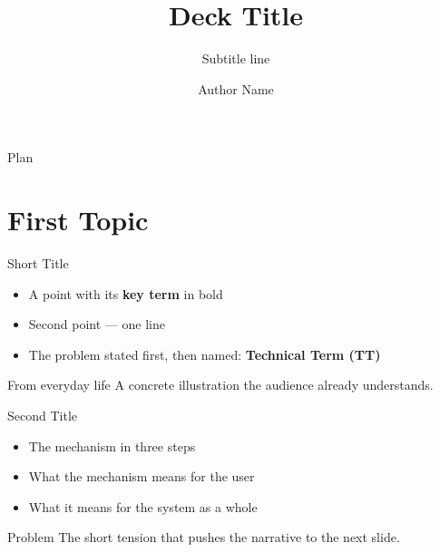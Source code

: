 

\title{Deck Title}
\subtitle{Subtitle line}
\author{Author Name}



\maketitleframe

\begin{frame}{Plan}
  \tableofcontents
\end{frame}

\section{First Topic}

\begin{frame}{Short Title}
  \begin{itemize}
    \item A point with its \textbf{key term} in bold
    \item Second point --- one line
    \item The problem stated first, then named: \textbf{Technical Term (TT)}
  \end{itemize}
  \vspace{0.3cm}
  \begin{exampleblock}{From everyday life}
    A concrete illustration the audience already understands.
  \end{exampleblock}
\end{frame}

\begin{frame}{Second Title}
  \begin{itemize}
    \item The mechanism in three steps
    \item What the mechanism means for the user
    \item What it means for the system as a whole
  \end{itemize}
  \vspace{0.3cm}
  \begin{alertblock}{Problem}
    The short tension that pushes the narrative to the next slide.
  \end{alertblock}
\end{frame}

